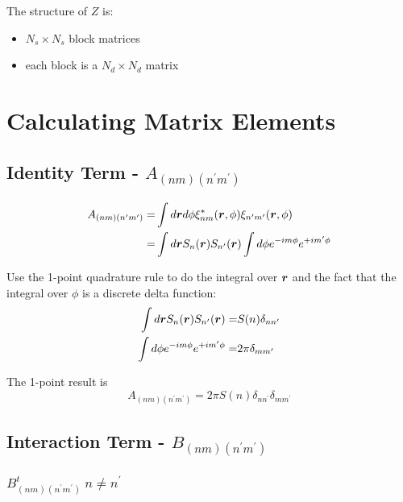 \documentclass [10pt,letterpaper]{article}
\begin{document}
The structure of $Z$ is:
\begin{itemize}
	\item $N_s\times N_s$ block matrices
	\item each block is a $N_d\times N_d$ matrix
\end{itemize}




\section{Calculating Matrix Elements}
\label{sec:calculate-matrix-elements}
\subsection{Identity Term - $A_{(n m)(n^\prime m^\prime)}$ }
\label{sub:identity-term-Anmnpmp}
\begin{equation} \label{eq:der-calculate-Anmnpmp}
	\begin{split}
		A_{(n m)(n^\prime m^\prime)}
		=&
		\int d\vectorsym{r} d\phi
		\xi^*_{n m}
		(\vectorsym{r},\phi)
		\xi_{n^\prime m^\prime}
		(\vectorsym{r},\phi) 
		\\
		=&
		\int d\vectorsym{r}
		S_n(\vectorsym{r})
		S_{n^\prime}(\vectorsym{r})
		\int d\phi
		e^{-i m \phi}
		e^{+i m^\prime \phi} 
	\end{split}
\end{equation}

Use the 1-point quadrature rule to do the integral over $\vectorsym{r}$ and the fact that the integral over $\phi$ is a discrete delta function:
\begin{align*}
	\int d\vectorsym{r}
	S_n(\vectorsym{r})
	S_{n^\prime}(\vectorsym{r})
	=&
	S(n)
	\delta_{n n^\prime}
	\\
	\int d\phi
	e^{-i m \phi}
	e^{+i m^\prime \phi}
	=&
	2\pi
	\delta_{m m^\prime}
\end{align*}

The 1-point result is
\begin{equation} \label{eq:result-Anmnpmp-1pt}
	A_{(n m)(n^\prime m^\prime)}
	=
	2\pi S(n)
	\delta_{n n^\prime}
	\delta_{m m^\prime}
\end{equation}
\subsection{Interaction Term - $B_{(n m)(n^\prime m^\prime)}$}
\label{sub:interaction-term-Bnmnpmp}
\subsubsection{$B^t_{(n m)(n^\prime m^\prime)} \ n\neq n^\prime$}
\label{subsub:Btnmnpmp-off-diagonal}
\end{document}
